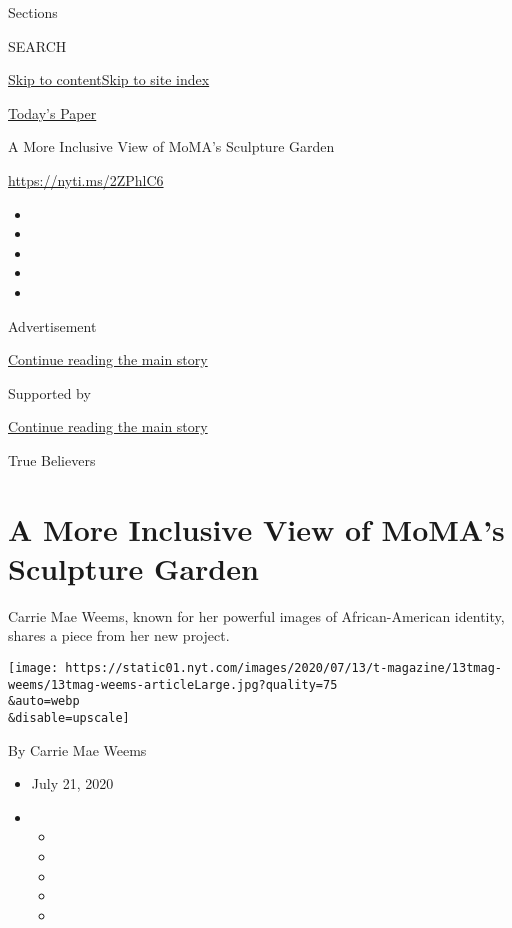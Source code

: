 Sections

SEARCH

\protect\hyperlink{site-content}{Skip to
content}\protect\hyperlink{site-index}{Skip to site index}

\href{https://myaccount.nytimes.com/auth/login?response_type=cookie\&client_id=vi}{}

\href{https://www.nytimes.com/section/todayspaper}{Today's Paper}

A More Inclusive View of MoMA's Sculpture Garden

\url{https://nyti.ms/2ZPhlC6}

\begin{itemize}
\item
\item
\item
\item
\item
\end{itemize}

Advertisement

\protect\hyperlink{after-top}{Continue reading the main story}

Supported by

\protect\hyperlink{after-sponsor}{Continue reading the main story}

True Believers

\hypertarget{a-more-inclusive-view-of-momas-sculpture-garden}{%
\section{A More Inclusive View of MoMA's Sculpture
Garden}\label{a-more-inclusive-view-of-momas-sculpture-garden}}

Carrie Mae Weems, known for her powerful images of African-American
identity, shares a piece from her new project.

\texttt{[image: https://static01.nyt.com/images/2020/07/13/t-magazine/13tmag-weems/13tmag-weems-articleLarge.jpg?quality=75\\\&auto=webp\\\&disable=upscale]}

By Carrie Mae Weems

\begin{itemize}
\item
  July 21, 2020
\item
  \begin{itemize}
  \item
  \item
  \item
  \item
  \item
  \end{itemize}
\end{itemize}

